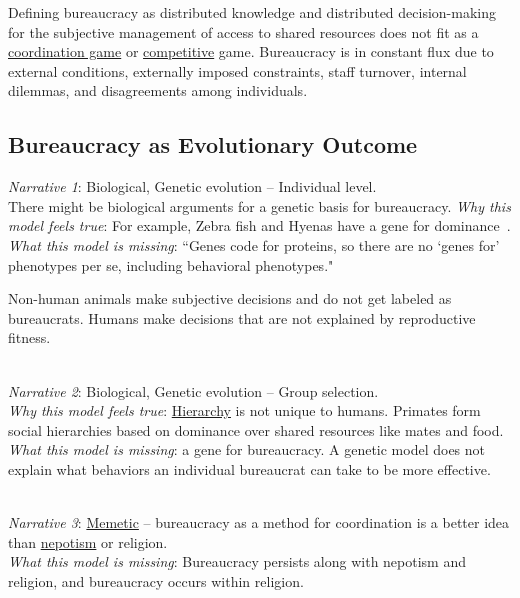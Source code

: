 Defining bureaucracy as distributed knowledge and distributed decision-making for the subjective management of access to shared resources does not fit as a \href{https://en.wikipedia.org/wiki/Coordination_game}{coordination game} 
or \href{https://en.wikipedia.org/wiki/Non-cooperative_game_theory}{competitive} game. 
Bureaucracy is in constant flux due to external conditions, externally imposed constraints, staff turnover, internal dilemmas, and disagreements among individuals. 

\subsection*{Bureaucracy as Evolutionary Outcome}

\textit{Narrative 1}: Biological, Genetic evolution -- Individual level. \\
There might be biological arguments for a genetic basis for bureaucracy. 
\textit{Why this model feels true}: For example, Zebra fish and Hyenas have a gene for dominance~\cite{2012_Holekamp}. \\
\textit{What this model is missing}: ``Genes code for proteins, so there are no `genes for' phenotypes per se, including behavioral phenotypes."~\cite{2015_Lilienfeld}

Non-human animals make subjective decisions and do not get labeled as bureaucrats. Humans make decisions that are not explained by reproductive fitness.

\ \\
\textit{Narrative 2}: Biological, Genetic evolution -- Group selection. \\
\textit{Why this model feels true}: \hyperref[sec:hierarchy-of-roles]{Hierarchy}
is not unique to humans. Primates form  social hierarchies based on dominance over shared resources like mates and food. \\
\textit{What this model is missing}: a gene for bureaucracy. A genetic model does not explain what behaviors an individual bureaucrat can take to be more effective. 

\ \\
\textit{Narrative 3}: \href{https://en.wikipedia.org/wiki/Memetics}{Memetic}
-- bureaucracy as a method for coordination is a better idea than \href{https://en.wikipedia.org/wiki/Nepotism}{nepotism} 
or religion. \\
\textit{What this model is missing}: Bureaucracy persists along with nepotism and religion, and bureaucracy occurs within religion. 

